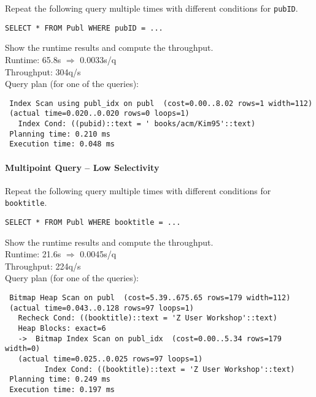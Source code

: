 \documentclass[11pt]{scrartcl}
\begin{document}
Repeat the following query multiple times with different conditions for {\tt pubID}.

{\small
\begin{verbatim}
SELECT * FROM Publ WHERE pubID = ...
\end{verbatim}
}

\noindent
\condA

\smallskip\noindent
Show the runtime results and compute the throughput.\\
Runtime: 65.8s $\Rightarrow$ 0.0033s/q\\
Throughput: 304q/s\\

\smallskip\noindent
Query plan (for one of the queries):
{\small
\begin{verbatim}
 Index Scan using publ_idx on publ  (cost=0.00..8.02 rows=1 width=112)
 (actual time=0.020..0.020 rows=0 loops=1)
   Index Cond: ((pubid)::text = ' books/acm/Kim95'::text)
 Planning time: 0.210 ms
 Execution time: 0.048 ms
\end{verbatim}
}


\paragraph{Multipoint Query -- Low Selectivity}

Repeat the following query multiple times with different conditions for {\tt booktitle}.

{\small
\begin{verbatim}
SELECT * FROM Publ WHERE booktitle = ...
\end{verbatim}
}

\noindent
\condB

\smallskip\noindent
Show the runtime results and compute the throughput.\\
Runtime: 21.6s $\Rightarrow$ 0.0045s/q\\
Throughput: 224q/s\\

\smallskip\noindent
Query plan (for one of the queries):
{\small
\begin{verbatim}
 Bitmap Heap Scan on publ  (cost=5.39..675.65 rows=179 width=112)
 (actual time=0.043..0.128 rows=97 loops=1)
   Recheck Cond: ((booktitle)::text = 'Z User Workshop'::text)
   Heap Blocks: exact=6
   ->  Bitmap Index Scan on publ_idx  (cost=0.00..5.34 rows=179 width=0)
   (actual time=0.025..0.025 rows=97 loops=1)
         Index Cond: ((booktitle)::text = 'Z User Workshop'::text)
 Planning time: 0.249 ms
 Execution time: 0.197 ms
\end{verbatim}
}
\end{document}
